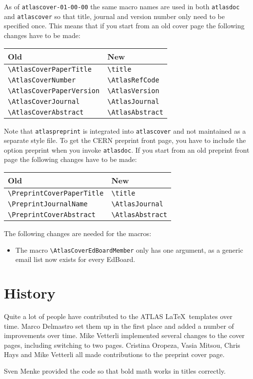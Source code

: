 \documentclass[koma,UKenglish]{style/atlasdoc}
\newcommand{\Macro}[1]{\texttt{\textbackslash #1}\xspace}
\newcommand{\Option}[1]{\textsf{#1}\xspace}
\newcommand{\Package}[1]{\texttt{#1}\xspace}
\begin{document}
As of \texttt{atlascover-01-00-00} the same macro names are used in both \texttt{atlasdoc} and
\texttt{atlascover} so that title, journal and version number only need to be specified once.
This means that if you start from an old cover page the following changes have to be made:
\begin{center}
	\begin{tabular}{ll}
		Old                            & New                   \\
		\midrule
		\Macro{AtlasCoverPaperTitle}   & \Macro{title}    \\
		\Macro{AtlasCoverNumber}       & \Macro{AtlasRefCode}  \\
		\Macro{AtlasCoverPaperVersion} & \Macro{AtlasVersion}  \\
		\Macro{AtlasCoverJournal}      & \Macro{AtlasJournal}  \\
		\Macro{AtlasCoverAbstract}     & \Macro{AtlasAbstract}
	\end{tabular}
\end{center}

Note that \texttt{atlaspreprint} is integrated into \texttt{atlascover} and not maintained as a separate style file.
To get the CERN preprint front page, you have to include the option \Option{preprint} when you invoke \Package{atlasdoc}.
If you start from an old preprint front page the following changes have to be made:
\begin{center}
	\begin{tabular}{ll}
		Old                              & New                   \\
		\midrule
		\Macro{PreprintCoverPaperTitle} & \Macro{title}    \\
		\Macro{PreprintJournalName}     & \Macro{AtlasJournal}  \\
		\Macro{PreprintCoverAbstract}   & \Macro{AtlasAbstract}
	\end{tabular}
\end{center}
The following changes are needed for the macros:
\begin{itemize}
\item The macro \Macro{AtlasCoverEdBoardMember} only has one argument, as a generic email list now exists for every EdBoard.
\end{itemize}


\section*{History}

Quite a lot of people have contributed to the ATLAS \LaTeX\ templates over time.
Marco Delmastro set them up in the first place and added a number of improvements over time.
Mike Vetterli implemented several changes to the cover pages, including switching to two pages.
Cristina Oropeza, Vasia Mitsou, Chris Hays and Mike Vetterli all made contributions to the preprint cover page.

Sven Menke provided the code so that bold math works in titles correctly.
\end{document}
